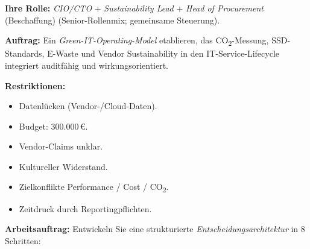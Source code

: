 \documentclass[11pt,a4paper,oneside]{article}
\begin{document}
\begin{infobox}
\textbf{Ihre Rolle:} \emph{CIO/CTO} + \emph{Sustainability Lead} + \emph{Head of Procurement} (Beschaffung) (Senior-Rollenmix; gemeinsame Steuerung).

\smallskip
\textbf{Auftrag:} Ein \emph{Green-IT-Operating-Model} etablieren, das CO\textsubscript{2}-Messung, SSD-Standards, E-Waste und Vendor Sustainability in den IT-Service-Lifecycle integriert \textendash{} auditf\"ahig und wirkungsorientiert.

\smallskip
\textbf{Restriktionen:}
\begin{itemize}
  \item Datenl\"ucken (Vendor-/Cloud-Daten).
  \item Budget: 300.000\,\euro{}.
  \item Vendor-Claims unklar.
  \item Kultureller Widerstand.
  \item Zielkonflikte Performance / Cost / CO\textsubscript{2}.
  \item Zeitdruck durch Reportingpflichten.
\end{itemize}
\end{infobox}

\noindent\textbf{Arbeitsauftrag:} Entwickeln Sie eine strukturierte \emph{Entscheidungsarchitektur} in 8 Schritten:
\end{document}
